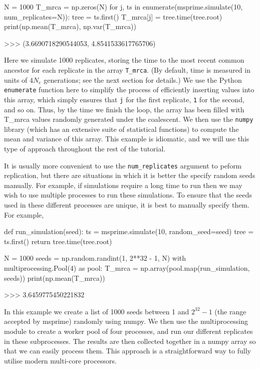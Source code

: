 \documentclass[graybox]{svmult}
\begin{document}
\begin{pythoncode}
N = 1000
T_mrca = np.zeros(N)
for j, ts in enumerate(msprime.simulate(10, num_replicates=N)):
    tree = ts.first()
    T_mrca[j] = tree.time(tree.root)
print(np.mean(T_mrca), np.var(T_mrca))

>>> (3.6690718290544053, 4.8541533617765706)
\end{pythoncode}

    Here we simulate 1000 replicates, storing the time to the most recent
common ancestor for each replicate in the array \texttt{T\_mrca}. (By
default, time is measured in units of \(4 N_e\) generations; see the
next section for details.) We use the Python \texttt{enumerate} function
here to simplify the process of efficiently inserting values into this
array, which simply ensures that \texttt{j} for the first replicate,
\texttt{1} for the second, and so on. Thus, by the time we finish the
loop, the array has been filled with T\_mrca values randomly generated
under the coalescent. We then use the \texttt{numpy} library (which has
an extensive suite of statistical functions) to compute the mean and
variance of this array. This example is idiomatic, and we will use this
type of approach throughout the rest of the tutorial.

It is usually more convenient to use the \texttt{num\_replicates}
argument to peform replication, but there are situations in which it is
better the specify random seeds manually. For example, if simulations
require a long time to run then we may wish to use multiple processes to
run these simulations. To ensure that the seeds used in these different
processes are unique, it is best to manually specify them. For example,

\begin{pythoncode}
def run_simulation(seed):
    ts = msprime.simulate(10, random_seed=seed)
    tree = ts.first()
    return tree.time(tree.root)

N = 1000
seeds = np.random.randint(1, 2**32 - 1, N)
with multiprocessing.Pool(4) as pool:
    T_mrca = np.array(pool.map(run_simulation, seeds))
print(np.mean(T_mrca))

>>> 3.6459775450221832
\end{pythoncode}

    In this example we create a list of 1000 seeds between 1 and $2^{32} -
1$ (the range accepted by msprime) randomly using numpy. We then use the
multiprocessing module to create a worker pool of four processes, and
run our different replicates in these subprocesses. The results are then
collected together in a numpy array so that we can easily process them.
This approach is a straightforward way to fully utilise modern
multi-core processors.
\end{document}
